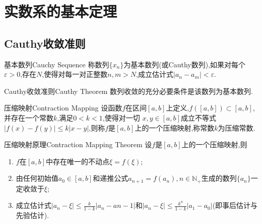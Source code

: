 \documentclass[cn,chinese]{elegantbook}
\begin{document}
    \chapter{实数系的基本定理}
        \section{Cauthy收敛准则}
        
        \begin{definition}{基本数列}{Cauchy Sequence}
            称数列$\{x_n\}$为基本数列(或Cauthy数列),如果对每个$\varepsilon>0$,存在$N$,使得对每一对正整数$n,m>N$,成立估计式$\lvert a_n-a_m\rvert<\varepsilon$.
        \end{definition}
        
        \begin{theorem}{Cauthy收敛准则}{Cauthy Theorem} 
            数列收敛的充分必要条件是该数列为基本数列.
        \end{theorem}
        
        \begin{definition}{压缩映射}{Contraction Mapping}
            设函数$f$在区间$[a,b]$上定义,$f([a,b])\subset [a,b]$,并存在一个常数$k$,满足$0<k<1$,使得对一切 $x,y\in [a,b]$成立不等式$\lvert f(x)-f(y)\rvert\leqslant k\lvert x-y\rvert$,则称$f$是$[a,b]$上的一个压缩映射,称常数$k$为压缩常数.
        \end{definition}
        \begin{theorem}{压缩映射原理}{Contraction Mapping Theorem}
            设$f$是$[a,b]$上的一个压缩映射,则
            \begin{enumerate}
                \item $f$在$[a,b]$中存在唯一的不动点$\xi=f(\xi)$;
                \item 由任何初始值$a_0\in[a,b]$和递推公式$a_{n+1}=f(a_n),n\in \mathbb{N}_+$生成的数列$\{a_n\}$一定收敛于$\xi$;
                \item 成立估计式$\lvert a_n-\xi\rvert\leqslant\frac{k}{1-k}\lvert a_n-a{n-1}\rvert$和$\lvert a_n-\xi\rvert\leqslant\frac{k^n}{1-k}\lvert a_1-a_0\rvert$(即事后估计与先验估计).
            \end{enumerate}
        \end{theorem}
\end{document}
